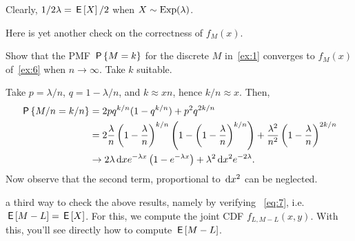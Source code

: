 Clearly, $1/2\lambda=\E X/2$ when $X\sim\Exp{\lambda}$.

Here is yet another check on the correctness of $f_M(x)$.
\begin{exercise}
Show that  the PMF $\P{M=k}$ for the discrete $M$ in~\cref{ex:1} converges to $f_M(x)$ of~\cref{ex:6} when $n\to \infty$. Take $k$ suitable.
\begin{solution} Take $p=\lambda/n$,  $q=1-\lambda/n$, and $k \approx x n$, hence $k/n \approx x$. Then,
  \begin{align*}
\P{M/n=k/n}
&= 2 p q^{k/n}(1-q^{k/n}) + p^2q^{2k/n} \\
&= 2 \frac \lambda n \left(1-\frac \lambda n\right)^{k/n}\left(1-\left(1-\frac \lambda n\right)^{k/n}\right) + \frac{\lambda^2}{n^2}\left(1-\frac \lambda n \right)^{2k/n} \\
&\to 2 \lambda \d x e^{-\lambda x} \left(1 - e^{-\lambda x}\right) + \lambda^{2} \d x^{2}e^{-2\lambda}.\label{eq:37}
  \end{align*}
Now observe that the second term, proportional to $\d x^{2}$ can be neglected.
\end{solution}
\end{exercise}


  a third  way to check the above results, namely by verifying ~\cref{eq:7}, i.e.  $\E{M-L} = \E X$.
For this, we  compute the joint CDF $f_{L, M-L}(x, y)$. With this,  you'll  see directly how to compute $\E{M-L}$.

